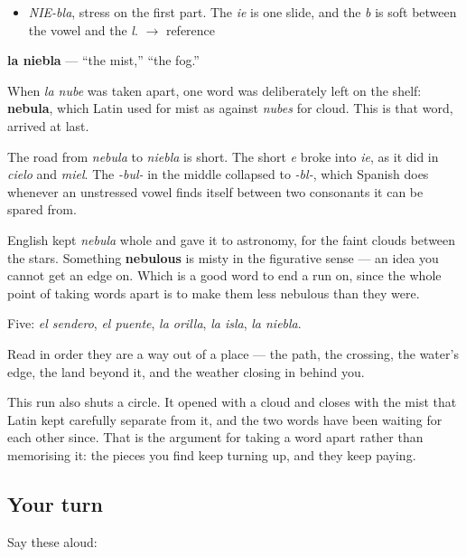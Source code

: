 \begin{sounds}
\begin{itemize}
\raggedright
  \item \emph{NIE-bla}, stress on the first part. The \emph{ie} is one slide, and the \emph{b} is soft between the vowel and the \emph{l}. $\to$ reference
\end{itemize}
\end{sounds}

\begin{cousinweb}
\textbf{la niebla} — \textquotedblleft{}the mist,\textquotedblright{} \textquotedblleft{}the fog.\textquotedblright{}

When \emph{la nube} was taken apart, one word was deliberately left on the shelf: \textbf{nebula}, which Latin used for mist as against \emph{nubes} for cloud. This is that word, arrived at last.

The road from \emph{nebula} to \emph{niebla} is short. The short \emph{e} broke into \emph{ie}, as it did in \emph{cielo} and \emph{miel}. The \emph{-bul-} in the middle collapsed to \emph{-bl-}, which Spanish does whenever an unstressed vowel finds itself between two consonants it can be spared from.

English kept \emph{nebula} whole and gave it to astronomy, for the faint clouds between the stars. Something \textbf{nebulous} is misty in the figurative sense — an idea you cannot get an edge on. Which is a good word to end a run on, since the whole point of taking words apart is to make them less nebulous than they were.
\end{cousinweb}

\begin{grammarlens}[title={What you've built}]
Five: \emph{el sendero}, \emph{el puente}, \emph{la orilla}, \emph{la isla}, \emph{la niebla}.

Read in order they are a way out of a place — the path, the crossing, the water's edge, the land beyond it, and the weather closing in behind you.

This run also shuts a circle. It opened with a cloud and closes with the mist that Latin kept carefully separate from it, and the two words have been waiting for each other since. That is the argument for taking a word apart rather than memorising it: the pieces you find keep turning up, and they keep paying.
\end{grammarlens}

\subsection*{Your turn}
Say these aloud:


